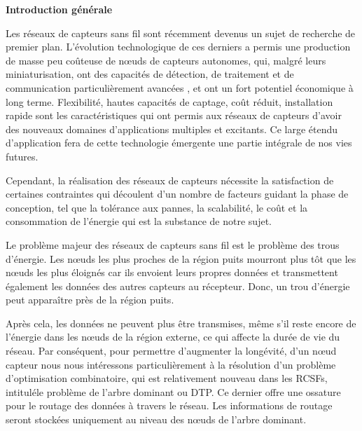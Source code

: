 

\begin{center}
	\LARGE\textbf{Introduction générale}
\end{center}

Les réseaux de capteurs sans fil sont récemment devenus un sujet de recherche de premier plan. L’évolution technologique de ces derniers a permis une production de masse peu coûteuse de nœuds de capteurs autonomes, qui, malgré leurs miniaturisation, ont des capacités de détection, de traitement et de communication particulièrement avancées \cite{yick2008wireless}, et ont un fort potentiel économique à long terme. Flexibilité, hautes capacités de captage, coût réduit, installation rapide sont les caractéristiques qui ont permis aux réseaux de capteurs d’avoir des nouveaux domaines d’applications multiples et excitants. Ce large étendu d’application fera de cette technologie émergente une partie intégrale de nos vies futures.


Cependant, la réalisation des réseaux de capteurs nécessite la satisfaction de certaines contraintes qui découlent d’un nombre de facteurs guidant la phase de conception, tel que la tolérance aux pannes, la scalabilité, le coût et la consommation de l’énergie qui est la substance de notre sujet.


Le problème majeur des réseaux de capteurs sans fil est le problème des trous d’énergie. Les nœuds les plus proches de la région puits mourront plus tôt que les nœuds les plus éloignés car ils envoient leurs propres données et transmettent également les données des autres capteurs au récepteur. Donc, un trou d’énergie peut apparaître  près de la région puits.



Après cela, les données ne peuvent plus être transmises, même s'il reste encore de l'énergie dans les nœuds de la région externe, ce qui affecte la durée de vie du réseau. Par conséquent, pour permettre d’augmenter la  longévité, d’un nœud capteur nous nous intéressons particulièrement à la résolution d’un problème d’optimisation combinatoire, qui est relativement nouveau dans les RCSFs, intituléle problème de l’arbre dominant ou DTP.  Ce dernier offre une ossature pour le routage des données à travers le réseau. Les informations de routage seront stockées uniquement au niveau des nœuds de l’arbre dominant.


